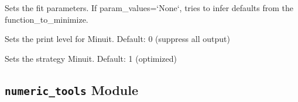 \documentclass[letterpaper,10pt,english]{sphinxmanual}
\begin{document}
\begin{fulllineitems}
\begin{fulllineitems}
\end{fulllineitems}


\begin{fulllineitems}
\label{api/kafe:kafe.minuit.Minuit.set_parameter_values}
Sets the fit parameters. If param\_values={}`None{}`, tries to infer defaults from the function\_to\_minimize.

\end{fulllineitems}


\begin{fulllineitems}
\label{api/kafe:kafe.minuit.Minuit.set_print_level}
Sets the print level for Minuit. Default: 0 (suppress all output)

\end{fulllineitems}


\begin{fulllineitems}
\label{api/kafe:kafe.minuit.Minuit.set_strategy}
Sets the strategy Minuit. Default: 1 (optimized)

\end{fulllineitems}


\end{fulllineitems}



\subsection{\texttt{numeric\_tools} Module}
\label{api/kafe:module-kafe.numeric_tools}\label{api/kafe:numeric-tools-module}\label{api/kafe:module-numeric_tools}
\end{document}
